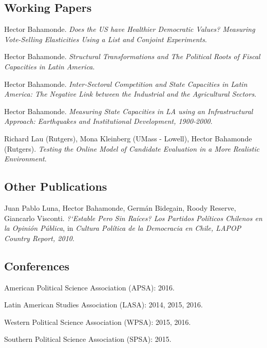 \documentclass[letterpaper]{article}
\renewenvironment{itemize}{
  \begin{list}{}{
    \setlength{\leftmargin}{1.5em}
  }
}{
  \end{list}
}
\begin{document}
\subsection*{Working Papers}

\begin{itemize}
\item Hector Bahamonde. \emph{Does the US have Healthier Democratic Values? Measuring Vote-Selling Elasticities Using a List and Conjoint Experiments}.
\item Hector Bahamonde. \emph{Structural Transformations and The Political Roots of Fiscal Capacities in Latin America}.
\item Hector Bahamonde. \emph{Inter-Sectoral Competition and State Capacities in Latin America: The Negative Link between the Industrial and the Agricultural Sectors}.
\item Hector Bahamonde. \emph{Measuring State Capacities in LA using an Infrastructural Approach: Earthquakes and Institutional Development, 1900-2000}.
\item Richard Lau (Rutgers), Mona Kleinberg (UMass - Lowell), Hector Bahamonde (Rutgers). \emph{Testing the Online Model of Candidate Evaluation in a More Realistic Environment}.
\end{itemize}

\subsection*{Other Publications}

\begin{itemize}
\item Juan Pablo Luna, Hector Bahamonde, Germ\'an Bidegain, Roody Reserve, Giancarlo Visconti. \emph{?`Estable Pero Sin Ra\'ices? Los Partidos Pol\'iticos Chilenos en la Opini\'on P\'ublica}, in \emph{Cultura Pol\'itica de la Democracia en Chile, LAPOP Country Report, 2010}.
\end{itemize}

\subsection*{Conferences}

\begin{itemize}
\item American Political Science Association (APSA): 2016.
\item Latin American Studies Association (LASA): 2014, 2015, 2016.
\item Western Political Science Association (WPSA): 2015, 2016.
\item Southern Political Science Association (SPSA): 2015.
\end{itemize}
\end{document}
